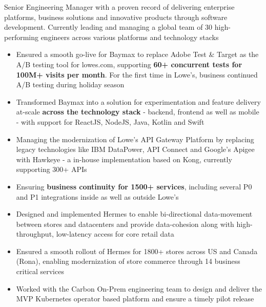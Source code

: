 \documentclass[10pt,a4paper,ragged2e,withhyper]{altacv}
\begin{document}
\begin{paracol}{2}

\begin{p}
Senior Engineering Manager with a proven record of delivering enterprise platforms, business solutions and innovative products through software development. Currently leading and managing a global team of 30 high-performing engineers across various platforms and technology stacks
\end{p}


\begin{itemize}
\item Ensured a smooth go-live for Baymax to replace Adobe Test \& Target as the A/B testing tool for lowes.com, supporting \textbf{60+ concurrent tests for 100M+ visits per month}. For the first time in Lowe's, business continued A/B testing during holiday season
\item Transformed Baymax into a solution for experimentation and feature delivery at-scale \textbf{across the technology stack} - backend, frontend as well as mobile - with support for ReactJS, NodeJS, Java, Kotlin and Swift
\item Managing the modernization of Lowe's API Gateway Platform by replacing legacy technologies like IBM DataPower, API Connect and Google's Apigee with Hawkeye - a in-house implementation based on Kong, currently supporting 300+ APIs
\item Ensuring \textbf{business continuity for 1500+ services}, including several P0 and P1 integrations inside as well as outside Lowe's
\end{itemize}

\begin{itemize}
\item Designed and implemented Hermes to enable bi-directional data-movement between stores and datacenters and provide data-cohesion along with high-throughput, low-latency access for core retail data
\item Ensured a smooth rollout of Hermes for 1800+ stores across US and Canada (Rona), enabling modernization of store commerce through 14 business critical services
\item Worked with the Carbon On-Prem engineering team to design and deliver the MVP Kubernetes operator based platform and ensure a timely pilot release
\end{itemize}


\end{paracol}
\end{document}
